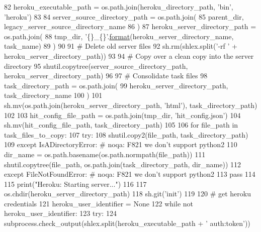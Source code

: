 \begin{DoxyCode}
82     heroku\_executable\_path = os.path.join(heroku\_directory\_path, \textcolor{stringliteral}{'bin'}, \textcolor{stringliteral}{'heroku'})
83 
84     server\_source\_directory\_path = os.path.join(
85         parent\_dir, legacy\_server\_source\_directory\_name
86     )
87     heroku\_server\_directory\_path = os.path.join(
88         tmp\_dir, \textcolor{stringliteral}{'\{\}\_\{\}'}.\hyperlink{namespaceparlai_1_1chat__service_1_1services_1_1messenger_1_1shared__utils_a32e2e2022b824fbaf80c747160b52a76}{format}(heroku\_server\_directory\_name, task\_name)
89     )
90 
91     \textcolor{comment}{# Delete old server files}
92     sh.rm(shlex.split(\textcolor{stringliteral}{'-rf '} + heroku\_server\_directory\_path))
93 
94     \textcolor{comment}{# Copy over a clean copy into the server directory}
95     shutil.copytree(server\_source\_directory\_path, heroku\_server\_directory\_path)
96 
97     \textcolor{comment}{# Consolidate task files}
98     task\_directory\_path = os.path.join(
99         heroku\_server\_directory\_path, task\_directory\_name
100     )
101     sh.mv(os.path.join(heroku\_server\_directory\_path, \textcolor{stringliteral}{'html'}), task\_directory\_path)
102 
103     hit\_config\_file\_path = os.path.join(tmp\_dir, \textcolor{stringliteral}{'hit\_config.json'})
104     sh.mv(hit\_config\_file\_path, task\_directory\_path)
105 
106     \textcolor{keywordflow}{for} file\_path \textcolor{keywordflow}{in} task\_files\_to\_copy:
107         \textcolor{keywordflow}{try}:
108             shutil.copy2(file\_path, task\_directory\_path)
109         \textcolor{keywordflow}{except} IsADirectoryError:  \textcolor{comment}{# noqa: F821 we don't support python2}
110             dir\_name = os.path.basename(os.path.normpath(file\_path))
111             shutil.copytree(file\_path, os.path.join(task\_directory\_path, dir\_name))
112         \textcolor{keywordflow}{except} FileNotFoundError:  \textcolor{comment}{# noqa: F821 we don't support python2}
113             \textcolor{keywordflow}{pass}
114 
115     print(\textcolor{stringliteral}{"Heroku: Starting server..."})
116 
117     os.chdir(heroku\_server\_directory\_path)
118     sh.git(\textcolor{stringliteral}{'init'})
119 
120     \textcolor{comment}{# get heroku credentials}
121     heroku\_user\_identifier = \textcolor{keywordtype}{None}
122     \textcolor{keywordflow}{while} \textcolor{keywordflow}{not} heroku\_user\_identifier:
123         \textcolor{keywordflow}{try}:
124             subprocess.check\_output(shlex.split(heroku\_executable\_path + \textcolor{stringliteral}{' auth:token'}))

\end{DoxyCode}
